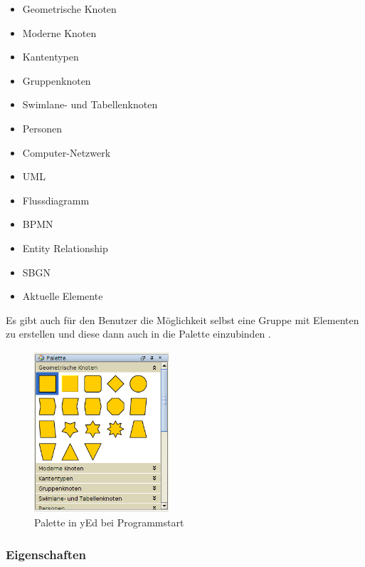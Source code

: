 \begin{multicols}{2}
    \begin{itemize}
        \item Geometrische Knoten
        \item Moderne Knoten
        \item Kantentypen
        \item Gruppenknoten
        \item Swimlane- und Tabellenknoten
        \item Personen
        \item Computer-Netzwerk
        \item UML
        \item Flussdiagramm
        \item BPMN 
        \item Entity Relationship
        \item SBGN
        \item Aktuelle Elemente
        \\
    \end{itemize}
\end{multicols}

\noindent
Es gibt auch für den Benutzer die Möglichkeit selbst eine Gruppe mit Elementen zu erstellen und diese dann auch in die Palette einzubinden . 

\begin{figure}[H]
	\begin{center}
		\includegraphics[width=5cm,height=6cm]{images/yed_palette_offen.png}
		\caption{Palette in yEd bei Programmstart}
		\label{yEdPaletteOffen}
	\end{center}
\end{figure}

\subsubsection{Eigenschaften}
\prc

